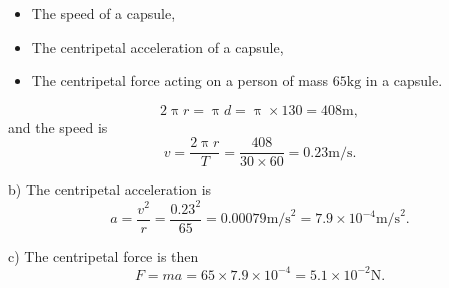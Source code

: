 \begin{itemize}
\setlength{\itemsep}{-5pt}
    \item[a)] The speed of a capsule,
    \item[b)] The centripetal acceleration of a capsule,
    \item[c)] The centripetal force acting on a person of mass $65\text{kg}$ in a capsule.
\end{itemize} 

\begin{equation*}
2\uppi r=\uppi d=\uppi \times 130=408\text{m},
\end{equation*}
and the speed is 
\begin{equation*}
v=\frac{2\uppi r}{T}=\frac{408}{30\times 60}=0.23\text{m/s}.
\end{equation*}

b) The centripetal acceleration is 
\begin{equation*}
a=\frac{v^{2}}{r}=\frac{0.23^{2}}{65}=0.00079\text{m/s}^{2}=7.9\times 10^{-4}\text{m/s}^{2}.
\end{equation*}

c) The centripetal force is then 
\begin{equation*}
F=ma=65\times 7.9\times 10^{-4}=5.1\times 10^{-2}\text{N}.
\end{equation*}


